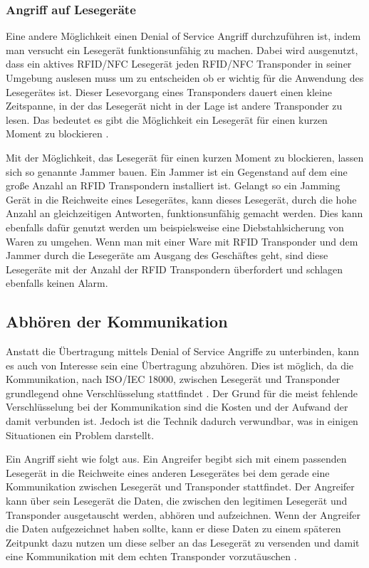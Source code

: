\documentclass[conference]{IEEEtran}
\begin{document}
\subsubsection{Angriff auf Lesegeräte}
Eine andere Möglichkeit einen Denial of Service Angriff durchzuführen ist, indem man versucht ein Lesegerät funktionsunfähig zu machen. Dabei wird ausgenutzt, dass ein aktives RFID/NFC Lesegerät jeden RFID/NFC Transponder in seiner Umgebung auslesen muss um zu entscheiden ob er wichtig für die Anwendung des Lesegerätes ist. Dieser Lesevorgang eines Transponders dauert einen kleine Zeitspanne, in der das Lesegerät nicht in der Lage ist andere Transponder zu lesen. Das bedeutet es gibt die Möglichkeit ein Lesegerät für einen kurzen Moment zu blockieren \cite{b3}.

Mit der Möglichkeit, das Lesegerät für einen kurzen Moment zu blockieren, lassen sich so genannte Jammer bauen. Ein Jammer ist ein Gegenstand auf dem eine große Anzahl an RFID Transpondern installiert ist. Gelangt so ein Jamming Gerät in die Reichweite eines Lesegerätes, kann dieses Lesegerät, durch die hohe Anzahl an gleichzeitigen Antworten, funktionsunfähig gemacht werden. Dies kann ebenfalls dafür genutzt werden um beispielsweise eine Diebstahlsicherung von Waren zu umgehen. Wenn man mit einer Ware mit RFID Transponder und dem Jammer durch die Lesegeräte am Ausgang des Geschäftes geht, sind diese Lesegeräte mit der Anzahl der RFID Transpondern überfordert und schlagen ebenfalls keinen Alarm.

\subsection{Abhören der Kommunikation}
Anstatt die Übertragung mittels Denial of Service Angriffe zu unterbinden, kann es auch von Interesse sein eine Übertragung abzuhören. Dies ist möglich, da die Kommunikation, nach ISO/IEC 18000, zwischen Lesegerät und Transponder grundlegend ohne Verschlüsselung stattfindet \cite{b3}. Der Grund für die meist fehlende Verschlüsselung bei der Kommunikation sind die Kosten und der Aufwand der damit verbunden ist. Jedoch ist die Technik dadurch verwundbar, was in einigen Situationen ein Problem darstellt.

Ein Angriff sieht wie folgt aus. Ein Angreifer begibt sich mit einem passenden Lesegerät in die Reichweite eines anderen Lesegerätes bei dem gerade eine Kommunikation zwischen Lesegerät und Transponder stattfindet. Der Angreifer kann über sein Lesegerät die Daten, die zwischen den legitimen Lesegerät und Transponder ausgetauscht werden, abhören und aufzeichnen. Wenn der Angreifer die Daten aufgezeichnet haben sollte, kann er diese Daten zu einem späteren Zeitpunkt dazu nutzen um diese selber an das Lesegerät zu versenden und damit eine Kommunikation mit dem echten Transponder vorzutäuschen \cite{b8}. 
\end{document}
